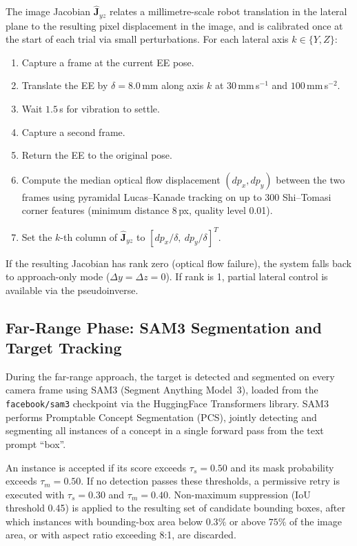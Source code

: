 \documentclass[lettersize,journal]{IEEEtran}
\begin{document}
The image Jacobian $\hat{\mathbf{J}}_{yz}$ relates a millimetre-scale robot
translation in the lateral plane to the resulting pixel displacement in the
image, and is calibrated once at the start of each trial via small
perturbations. For each lateral axis $k \in \{Y, Z\}$:
\begin{enumerate}
  \item Capture a frame at the current EE pose.
  \item Translate the EE by $\delta = 8.0$\,mm along axis $k$ at
        $30$\,mm\,s$^{-1}$ and $100$\,mm\,s$^{-2}$.
  \item Wait $1.5$\,s for vibration to settle.
  \item Capture a second frame.
  \item Return the EE to the original pose.
  \item Compute the median optical flow displacement $(dp_x, dp_y)$ between
        the two frames using pyramidal Lucas--Kanade tracking on up to 300
        Shi--Tomasi corner features (minimum distance 8\,px, quality
        level 0.01).
  \item Set the $k$-th column of $\hat{\mathbf{J}}_{yz}$ to
        $[dp_x/\delta,\ dp_y/\delta]^T$.
\end{enumerate}
If the resulting Jacobian has rank zero (optical flow failure), the system
falls back to approach-only mode ($\Delta y = \Delta z = 0$). If rank is 1,
partial lateral control is available via the pseudoinverse.

\subsection{Far-Range Phase: SAM3 Segmentation and Target Tracking}
\label{sec:sam3}

During the far-range approach, the target is detected and segmented on every
camera frame using SAM3 (Segment Anything Model~3), loaded from the
\texttt{facebook/sam3} checkpoint via the HuggingFace Transformers library.
SAM3 performs Promptable Concept Segmentation (PCS), jointly detecting and
segmenting all instances of a concept in a single forward pass from the text
prompt ``box''.

An instance is accepted if its score exceeds $\tau_s = 0.50$ and its mask
probability exceeds $\tau_m = 0.50$. If no detection passes these thresholds,
a permissive retry is executed with $\tau_s = 0.30$ and $\tau_m = 0.40$.
Non-maximum suppression (IoU threshold 0.45) is applied to the resulting set
of candidate bounding boxes, after which instances with bounding-box area
below $0.3\%$ or above $75\%$ of the image area, or with aspect ratio
exceeding 8:1, are discarded.
\end{document}
